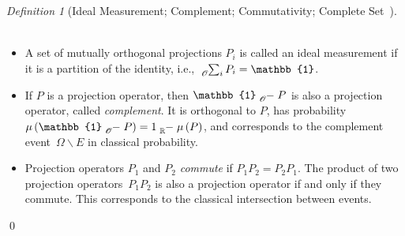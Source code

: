 \documentclass{article}
\theoremstyle{remark}
\newtheorem{definition}{Definition}
\newcommand{\yutsung}[1]{\fbox{\begin{minipage}{0.9\textwidth}\color{purple}{Yu-Tsung says: #1}\end{minipage}}}
\begin{document}
\begin{definition}[Ideal Measurement; Complement; Commutativity;
Complete Set~\cite{Swart2013,peres1995quantum,Griffiths2003}]~ 
\begin{itemize}
\item A set of mutually orthogonal projections $P_{i}$ is called an ideal
measurement if it is a partition of the identity, i.e., $\tensor*[_{\mathscr{O}}]{\sum}{_{i}}P_{i}=\mathbb{1}$. 
\item If $P$ is a projection operator, then $\mathbb{1}\tensor*[_{\mathscr{O}}]{-}{}P$
is also a projection operator, called \emph{complement}. It is orthogonal to $P$, has
probability~$\mu\left(\mathbb{1}\tensor*[_{\mathscr{O}}]{-}{}P\right)=1\tensor*[_{\mathbb{R}}]{-}{}\mu\left(P\right)$, 
and corresponds to the complement event~$\Omega\backslash E$
in classical probability.
\item Projection operators $P_{1}$ and $P_{2}$ \emph{commute} if $P_{1}P_{2}=P_{2}P_{1}$.
The product of two projection operators~$P_{1}P_{2}$ is also a projection
operator if and only if they commute. This corresponds to the classical intersection
between events. 
\end{itemize}
\qed\end{definition}
\end{document}
